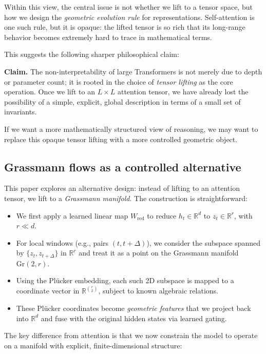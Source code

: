 \documentclass[11pt]{article}
\newcommand{\Gr}{\mathrm{Gr}}
\begin{document}
Within this view, the central issue is not whether we lift to a tensor space, but how we design the \emph{geometric evolution rule} for representations. Self-attention is one such rule, but it is opaque: the lifted tensor is so rich that its long-range behavior becomes extremely hard to trace in mathematical terms.

This suggests the following sharper philosophical claim:

\medskip
\noindent\textbf{Claim.} The non-interpretability of large Transformers is not merely due to depth or parameter count; it is rooted in the choice of \emph{tensor lifting} as the core operation. Once we lift to an $L\times L$ attention tensor, we have already lost the possibility of a simple, explicit, global description in terms of a small set of invariants.
\medskip

If we want a more mathematically structured view of reasoning, we may want to replace this opaque tensor lifting with a more controlled geometric object.

\subsection{Grassmann flows as a controlled alternative}

This paper explores an alternative design: instead of lifting to an attention tensor, we lift to a \emph{Grassmann manifold}. The construction is straightforward:

\begin{itemize}
    \item We first apply a learned linear map $W_{\text{red}}$ to reduce $h_t \in \mathbb{R}^d$ to $z_t \in \mathbb{R}^r$, with $r \ll d$.
    \item For local windows (e.g., pairs $(t, t+\Delta)$), we consider the subspace spanned by $\{z_t, z_{t+\Delta}\}$ in $\mathbb{R}^r$ and treat it as a point on the Grassmann manifold $\Gr(2,r)$.
    \item Using the Pl\"ucker embedding, each such 2D subspace is mapped to a coordinate vector in $\mathbb{R}^{\binom{r}{2}}$, subject to known algebraic relations.
    \item These Pl\"ucker coordinates become \emph{geometric features} that we project back into $\mathbb{R}^d$ and fuse with the original hidden states via learned gating.
\end{itemize}

The key difference from attention is that we now constrain the model to operate on a manifold with explicit, finite-dimensional structure:
\end{document}
